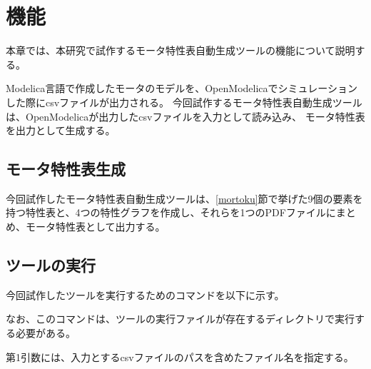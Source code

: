 \chapter{機能}\label{cha:Function}
本章では、本研究で試作するモータ特性表自動生成ツールの機能について説明する。

Modelica言語で作成したモータのモデルを、OpenModelicaでシミュレーションした際にcsvファイルが出力される。
今回試作するモータ特性表自動生成ツールは、OpenModelicaが出力したcsvファイルを入力として読み込み、
モータ特性表を出力として生成する。
\section{モータ特性表生成}\label{kenkyu_mokuteki}
今回試作したモータ特性表自動生成ツールは、\ref{mortoku}節で挙げた9個の要素を持つ特性表と、4つの特性グラフを作成し、それらを1つのPDFファイルにまとめ、モータ特性表として出力する。
\section{ツールの実行}\label{zikkou}
今回試作したツールを実行するためのコマンドを以下に示す。
% 	
\begin{figure}[t]
	
\end{figure}
なお、このコマンドは、ツールの実行ファイルが存在するディレクトリで実行する必要がある。

第1引数には、入力とするcsvファイルのパスを含めたファイル名を指定する。

